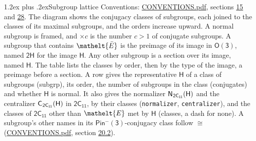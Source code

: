 \documentclass[10pt,a4paper]{article}
\makeatletter
\renewcommand\section{\@startsection{section}{1}{\z@}{-3ex plus -1ex minus -.2ex}%
  {1.2ex plus .2ex}{\normalfont\large\sffamily\bfseries\color{parttitle}}}
\numberwithin{equation}{section}
\newcommand{\eltfont}[1]{{\let\sigma\eltsigma\mathelt{#1}}}
\newcommand{\grp}[1]{\mathsf{#1}}
\newcommand{\cls}[1]{\eltfont{#1}}
\newcommand{\elt}[1]{\eltfont{#1}}
\newcommand{\samecls}{\cong}
\newcommand{\barred}[1]{\bar{#1}}
\newcommand{\hairsp}{\mkern1mu}
\makeatother
\begin{document}
\section{Subgroup lattice}\label{s:subgroups}
Conventions: \href{../../CONVENTIONS.pdf}{CONVENTIONS.pdf}, sections \href{../../../rotation/CONVENTIONS.pdf\#conv.15}{15} and \href{../../CONVENTIONS.pdf\#conv.28}{28}.
The diagram shows the conjugacy classes of subgroups, each joined to the classes of its maximal subgroups, and the orders increase upward. \label{n:index.conjugates.c}A normal subgroup is framed, and ${\times}c$ is the number $c > 1$ of conjugate subgroups. \label{n:group.H}A subgroup that contains $\elt{\barred{E}}$ is the preimage of its image in $\grp{O(3)}$, named $\grp{2H}$ for the image $\grp{H}$. Any other subgroup is a section over its image, named $\grp{H}$. The table lists the classes by order, then by the type of the image, a preimage before a section. \label{n:head.subgroup}\label{n:head.order}\label{n:head.conjugates}\label{n:head.normal}A row gives the representative $\grp{H}$ of a class of subgroups (subgrp), its order, the number of subgroups in the class (conjugates) and whether $\grp{H}$ is normal. \label{n:group.normalizer}\label{n:group.centralizer}\label{n:head.classes}It also gives the normalizer $\grp{N}_{\hairsp \grp{2C_{11}}}(\grp{H})$ and the centralizer $\grp{C}_{\hairsp \grp{2C_{11}}}(\grp{H})$ in $\grp{2C_{11}}$, by their classes (\texttt{normalizer}, \texttt{centralizer}), and the classes of $\grp{2C_{11}}$ other than $\cls{E}$ met by $\grp{H}$ (classes, a dash for none). A subgroup's other names in its \href{Pinminus3.pdf}{$\grp{Pin^{-}(3)}$}-conjugacy class follow $\samecls$ (\href{../../CONVENTIONS.pdf}{CONVENTIONS.pdf}, section \href{../../CONVENTIONS.pdf\#conv.20.2}{20.2}).
\begin{center}
\end{center}
\end{document}
